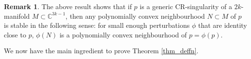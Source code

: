 \documentclass[10pt]{amsart}
\numberwithin{equation}{section}
\theoremstyle{definition}
\theoremstyle{definition}
\newtheorem*{rmk}{Remark}
\theoremstyle{plain}
\newtheorem{lemma}[theorem]{Lemma}
\newcommand{\U}{\mathcal{U}}
\newcommand{\C} {\mathbb{C}}
\begin{document}
\begin{rmk}
The above result shows that if $p$ is a generic CR-singularity of a $2k$-manifold $M\subset\C^{3k-1}$, then any polynomially convex neighbourhood $N\subset M$ of $p$ is stable in the following sense: for small enough perturbations $\phi$ that are identity close to $p$, $\phi(N)$ is a polynomially convex neighbourhood of $p=\phi(p)$.
\end{rmk}

We now have the main ingredient to prove Theorem \ref{thm_deffn}.
\end{document}
